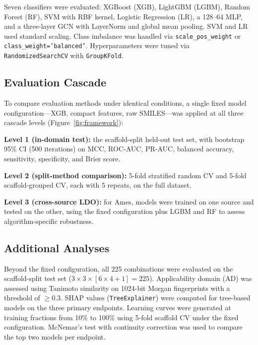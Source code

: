 Seven classifiers were evaluated: XGBoost (XGB),\cite{Chen_XGBoost_2016} LightGBM 
(LGBM),\cite{Ke_LightGBM_2017} Random Forest (RF),\cite{Breiman_2001} SVM with RBF 
kernel,\cite{Cortes_Vapnik_1995} Logistic Regression (LR),\cite{Cox_1958} a 128--64 
MLP,\cite{Rumelhart_1986} and a three-layer GCN\cite{Kipf_Welling_2017} with LayerNorm and 
global mean pooling. SVM and LR used standard scaling. Class imbalance was handled via 
\texttt{scale\_pos\_weight} or \texttt{class\_weight='balanced'}. Hyperparameters were tuned 
via \texttt{RandomizedSearchCV} with \texttt{GroupKFold}\cite{Pedregosa_sklearn_2011}.

\subsection{Evaluation Cascade}

To compare evaluation methods under identical conditions, a single fixed model 
configuration---XGB, compact features, raw SMILES---was applied at all three cascade 
levels (Figure~\ref{fig:framework}):

\textbf{Level 1 (in-domain test):} the scaffold-split held-out test set, with bootstrap 
95\% CI (500 iterations) on MCC,\cite{Matthews_1975} ROC-AUC, PR-AUC, balanced accuracy, 
sensitivity, specificity, and Brier score.\cite{Brier_1950}

\textbf{Level 2 (split-method comparison):} 5-fold stratified random CV and 5-fold 
scaffold-grouped CV, each with 5 repeats, on the full dataset.

\textbf{Level 3 (cross-source LDO):} for Ames, models were trained on one source and 
tested on the other, using the fixed configuration plus LGBM and RF to assess 
algorithm-specific robustness.

\subsection{Additional Analyses}

Beyond the fixed configuration, all 225 combinations were evaluated on the scaffold-split 
test set ($3 \times 3 \times [6 \times 4 + 1] = 225$). Applicability domain (AD) was 
assessed using Tanimoto similarity on 1024-bit Morgan 
fingerprints\cite{Rogers_Hahn_2010} with a threshold of $\geq 0.3$. SHAP 
values\cite{Lundberg_SHAP_2017} (\texttt{TreeExplainer}) were computed for tree-based 
models on the three primary endpoints. Learning curves were generated at training fractions 
from 10\% to 100\% using 5-fold scaffold CV under the fixed configuration. McNemar's 
test\cite{McNemar_1947} with continuity correction was used to compare the top two models 
per endpoint.

